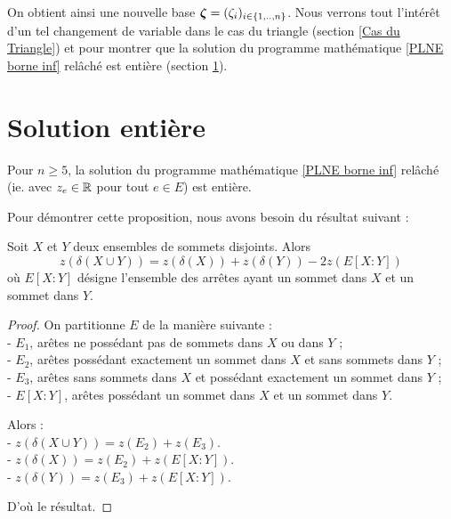 On obtient ainsi une nouvelle base $\boldsymbol{\zeta} = (\zeta_i)_{i \in \{1,..,n\}}$. Nous verrons tout l'intérêt d'un tel changement de variable dans le cas du triangle (section \ref{Cas du Triangle}) et pour montrer que la solution du programme mathématique \eqref{PLNE borne inf} relâché est entière (section \ref{Section solution entiere}).


\section{Solution entière}
\label{Section solution entiere}

\begin{prop} \label{Solution entière}
Pour $n \ge 5$, la solution du programme mathématique \eqref{PLNE borne inf} relâché (ie. avec $z_e \in \mathbb{R}$ pour tout $e \in E$) est entière.
\end{prop}

Pour démontrer cette proposition, nous avons besoin du résultat suivant :

\begin{prop} \label{cout union}
Soit $X$ et $Y$ deux ensembles de sommets disjoints. Alors
\[z(\delta(X \cup Y)) = z(\delta(X)) + z(\delta(Y)) - 2 z(E[X:Y])\]
où $E[X:Y]$ désigne l'ensemble des arrêtes ayant un sommet dans $X$ et un sommet dans $Y$.
\end{prop}

\begin{proof}
On partitionne $E$ de la manière suivante :\\
- $E_1$, arêtes ne possédant pas de sommets dans $X$ ou dans $Y$ ;\\
- $E_2$, arêtes possédant exactement un sommet dans $X$ et sans sommets dans $Y$ ;\\
- $E_3$, arêtes sans sommets dans $X$ et possédant exactement un sommet dans $Y$ ;\\
- $E[X:Y]$, arêtes possédant un sommet dans $X$ et un sommet dans $Y$.

Alors :\\
- $z(\delta(X \cup Y)) = z(E_2) + z(E_3)$.\\
- $z(\delta(X)) = z(E_2) + z(E[X:Y])$.\\
- $z(\delta(Y)) = z(E_3) + z(E[X:Y])$.

D'où le résultat.
\end{proof}

